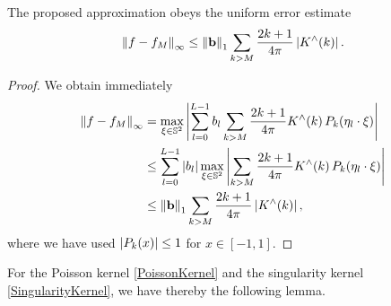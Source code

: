 \begin{lemma}\label{lemma:error}
  The proposed approximation obeys the uniform error estimate
  \begin{equation}
    \label{Applications:UniformErrorBound}
    \left\|f - f_{M}\right\|_{\infty} \le \left\|\mathbf{b}\right\|_1 \sum_{k>M}
    \frac{2k+1}{4\pi} \left\vert K^{\wedge}{\hspace{-0.4ex}}\left(k\right)\right\vert.
  \end{equation}
\end{lemma}
\begin{proof}
  We obtain immediately
  \begin{align*}
    \left\|f - f_{M}\right\|_{\infty} 
    & = \max_{\mathbf{\xi} \in \mathbb{S}^2} 
        \left|\sum_{l=0}^{L-1} b_{l} \sum_{k>M} \frac{2k+1}{4\pi} K^{\wedge}{\hspace{-0.4ex}}\left(k\right) 
        P_{k}{\hspace{-0.4ex}}\left(\mathbf{\eta}_{l} \cdot \mathbf{\xi}\right)\right| \\
    & \le \sum_{l=0}^{L-1} \left| b_{l} \right| \max_{\mathbf{\xi} \in \mathbb{S}^2} 
      \left| \sum_{k>M} \frac{2k+1}{4\pi} K^{\wedge}{\hspace{-0.4ex}}\left(k\right) 
      P_{k}{\hspace{-0.4ex}}\left(\mathbf{\eta}_{l} \cdot \mathbf{\xi}\right) \right| \\
    & \le \left\|\mathbf{b}\right\|_1 \sum_{k>M} \frac{2k+1}{4\pi} \left\vert K^{\wedge}{\hspace{-0.4ex}}\left(k\right)\right\vert,
  \end{align*}
  where we have used $\left|P_{k}{\hspace{-0.4ex}}\left(x\right)\right| \le 1$ for $x \in [-1,1]$. 
\end{proof}

For the Poisson kernel \eqref{PoissonKernel} and the singularity kernel
\eqref{SingularityKernel}, we have thereby the following lemma.

